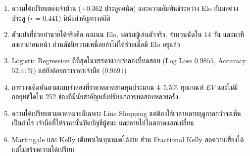 \begin{enumerate}[label=\arabic*)]
    \item ความได้เปรียบของเจ้าบ้าน ($+0.362$ ประตูต่อนัด) และความสัมพันธ์ระหว่าง Elo กับผลต่างประตู ($r = 0.441$) มีนัยสำคัญทางสถิติ
    \item ตัวแปรที่ช่วยทำนายได้จริงคือ คะแนน Elo, ฟอร์มผู้เล่นตัวจริง, จำนวนนัดใน 14 วัน และนาทีลงเล่นก่อนหน้า ส่วนดัชนีความเหนื่อยล้าไม่ได้ช่วยเมื่อมี Elo อยู่แล้ว
    \item Logistic Regression ดีที่สุดในบรรดาแบบจำลองที่ทดสอบ (Log Loss $0.9855$, Accuracy $52.41\%$) แต่ยังด้อยกว่าราคาเจ้ามือ ($0.9691$)
    \item การวางเดิมพันตามแบบจำลองที่ราคาตลาดขาดทุนประมาณ $4$--$5.5\%$ ทุกเกณฑ์ $EV$ และไม่มีกลยุทธ์ใดใน 252 ช่องที่มีนัยสำคัญหลังปรับแก้การทดสอบหลายครั้ง
    \item ความได้เปรียบตามคาดหมายมีเฉพาะ Line Shopping แต่ต้องใช้เวลาหลายฤดูกาลกว่าจะเห็นเป็นกำไร เจ้ามือที่ให้ราคานั้นปิดบัญชีผู้ชนะ และหายไปในตลาดแลกเปลี่ยน
    \item Martingale และ Kelly เต็มพาเงินทุนหมดได้ง่าย ส่วน Fractional Kelly ลดความเสี่ยงได้แต่ไม่สร้างความได้เปรียบ
\end{enumerate}
